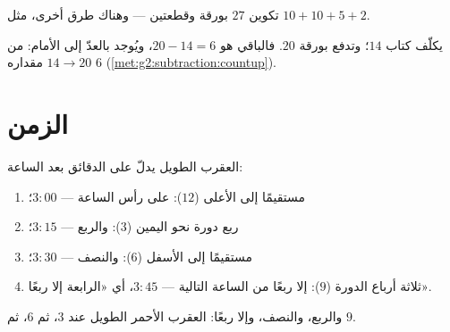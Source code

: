 \begin{omfigure}

{\small تكوين $27$ بورقة وقطعتين --- وهناك طرق أخرى،
مثل $10 + 10 + 5 + 2$.}
\end{omfigure}

\begin{example}[الباقي]\label{ex:g2:measure:change}
يكلّف كتاب $14$؛ وتدفع بورقة $20$. فالباقي هو $20 - 14 =
6$، ويُوجد بالعدّ إلى الأمام: من $14 \to 20$ مقداره $6$
(\cref{met:g2:subtraction:countup}).
\end{example}

\section{الزمن}

\begin{method}\label{met:g2:measure:clock}
العقرب الطويل يدلّ على الدقائق بعد الساعة:
\begin{enumerate}
  \item مستقيمًا إلى الأعلى ($12$): على رأس الساعة --- $3{:}00$؛
  \item ربع دورة نحو اليمين ($3$): والربع --- $3{:}15$؛
  \item مستقيمًا إلى الأسفل ($6$): والنصف --- $3{:}30$؛
  \item ثلاثة أرباع الدورة ($9$): إلا ربعًا من الساعة التالية ---
        $3{:}45$، أي «الرابعة إلا ربعًا».
\end{enumerate}
\end{method}

\begin{omfigure}

{\small والربع، والنصف، وإلا ربعًا: العقرب الأحمر الطويل عند
$3$، ثم $6$، ثم $9$.}
\end{omfigure}

